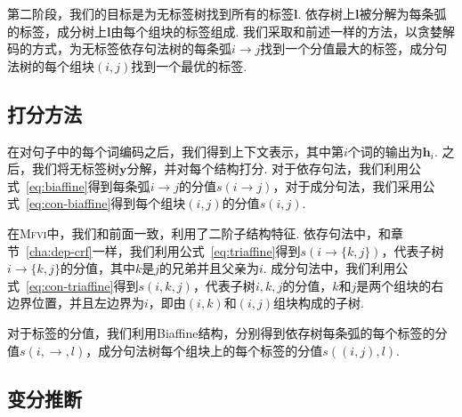 第二阶段，我们的目标是为无标签树找到所有的标签$\boldsymbol{l}$.
依存树上$\boldsymbol{l}$被分解为每条弧的标签，成分树上$\boldsymbol{l}$由每个组块的标签组成.
我们采取和前述一样的方法，以贪婪解码的方式，为无标签依存句法树的每条弧$i\rightarrow j$找到一个分值最大的标签，成分句法树的每个组块$(i,j)$找到一个最优的标签.

\subsection{打分方法}

在对句子中的每个词编码之后，我们得到上下文表示，其中第$i$个词的输出为$\mathbf{h}_i$.
之后，我们将无标签树$\boldsymbol{y}$分解，并对每个结构打分.
对于依存句法，我们利用公式~\ref{eq:biaffine}得到每条弧$i\rightarrow j$的分值$s(i\rightarrow j)$，对于成分句法，我们采用公式~\ref{eq:con-biaffine}得到每个组块$(i, j)$的分值$s(i, j)$.

在\textsc{Mfvi}中，我们和前面一致，利用了二阶子结构特征.
依存句法中，和章节~\ref{cha:dep-crf}一样，我们利用公式~\ref{eq:triaffine}得到$s(i\rightarrow\{k,j\})$，代表子树$i\rightarrow \{k,j\}$的分值，其中$k$是$j$的兄弟并且父亲为$i$.
成分句法中，我们利用公式~\ref{eq:con-triaffine}得到$s(i,k,j)$，代表子树$i,k,j$的分值，$k$和$j$是两个组块的右边界位置，并且左边界为$i$，即由$(i,k)$和$(i,j)$组块构成的子树.

对于标签的分值，我们利用Biaffine结构，分别得到依存树每条弧的每个标签的分值$s(i,\rightarrow,l)$，成分句法树每个组块上的每个标签的分值$s((i,j),l)$.

\subsection{变分推断}

